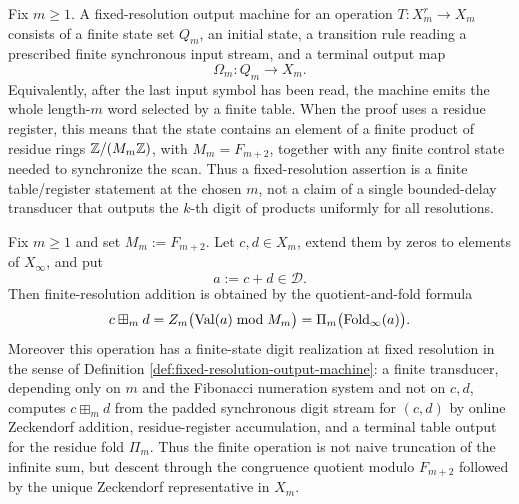 \begin{definition}\label{def:fixed-resolution-output-machine}
Fix \(m\ge1\). A fixed-resolution output machine for an operation \(T:X_m^r\to X_m\) consists of a finite state set \(Q_m\), an initial state, a transition rule reading a prescribed finite synchronous input stream, and a terminal output map
\[
\Omega_m:Q_m\longrightarrow X_m.
\]
Equivalently, after the last input symbol has been read, the machine emits the whole length-\(m\) word selected by a finite table. When the proof uses a residue register, this means that the state contains an element of a finite product of residue rings \(\mathbb{Z}/(M_m\mathbb{Z})\), with \(M_m=F_{m+2}\), together with any finite control state needed to synchronize the scan. Thus a fixed-resolution assertion is a finite table/register statement at the chosen \(m\), not a claim of a single bounded-delay transducer that outputs the \(k\)-th digit of products uniformly for all resolutions.
\end{definition}

\begin{theorem}\label{thm:finite-add-residue-fold-fst}
Fix \(m\ge 1\) and set \(M_m:=F_{m+2}\). Let \(c,d\in X_m\), extend them by zeros to elements of \(X_\infty\), and put
\[
a:=c+d\in\mathcal{D}.
\]
Then finite-resolution addition is obtained by the quotient-and-fold formula
\[
c\boxplus_m d
=Z_m\bigl(\mathrm{Val}(a)\bmod M_m\bigr)
=\Pi_m\bigl(\operatorname{Fold}_\infty(a)\bigr).
\]
Moreover this operation has a finite-state digit realization at fixed resolution in the sense of Definition \ref{def:fixed-resolution-output-machine}: a finite transducer, depending only on \(m\) and the Fibonacci numeration system and not on \(c,d\), computes \(c\boxplus_m d\) from the padded synchronous digit stream for \((c,d)\) by online Zeckendorf addition, residue-register accumulation, and a terminal table output for the residue fold \(\Pi_m\). Thus the finite operation is not naive truncation of the infinite sum, but descent through the congruence quotient modulo \(F_{m+2}\) followed by the unique Zeckendorf representative in \(X_m\).
\end{theorem}

